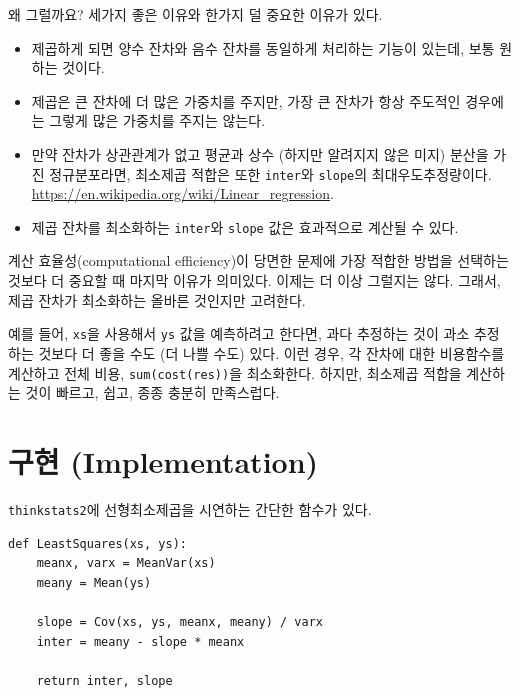 왜 그럴까요? 세가지 좋은 이유와 한가지 덜 중요한 이유가 있다.

\begin{itemize}

\item 제곱하게 되면 양수 잔차와 음수 잔차를 동일하게 처리하는 기능이 있는데, 보통 원하는 것이다.

\item 제곱은 큰 잔차에 더 많은 가중치를 주지만, 가장 큰 잔차가 항상 주도적인 경우에는 그렇게 많은 가중치를 주지는 않는다.

\item 만약 잔차가 상관관계가 없고 평균과 상수 (하지만 알려지지 않은 미지) 분산을 가진 정규분포라면,
최소제곱 적합은 또한 {\tt inter}와 {\tt slope}의 최대우도추정량이다. \url{https://en.wikipedia.org/wiki/Linear_regression}.  

\item 제곱 잔차를 최소화하는 {\tt inter}와 {\tt slope} 값은 효과적으로 계산될 수 있다.

\end{itemize}

계산 효율성(computational efficiency)이 당면한 문제에 가장 적합한 방법을 선택하는 것보다 더 중요할 때 마지막 이유가 의미있다. 
이제는 더 이상 그럴지는 않다. 그래서, 제곱 잔차가 최소화하는 올바른 것인지만 고려한다.

예를 들어, {\tt xs}을 사용해서 {\tt ys} 값을 예측하려고 한다면,
과다 추정하는 것이 과소 추정하는 것보다 더 좋을 수도 (더 나쁠 수도) 있다.
이런 경우, 각 잔차에 대한 비용함수를 계산하고 전체 비용, {\tt sum(cost(res))}을 최소화한다.
하지만, 최소제곱 적합을 계산하는 것이 빠르고, 쉽고, 종종 충분히 만족스럽다.


\section{구현 (Implementation)}

{\tt thinkstats2}에 선형최소제곱을 시연하는 간단한 함수가 있다.

\begin{verbatim}
def LeastSquares(xs, ys):
    meanx, varx = MeanVar(xs)
    meany = Mean(ys)

    slope = Cov(xs, ys, meanx, meany) / varx
    inter = meany - slope * meanx

    return inter, slope
\end{verbatim}

